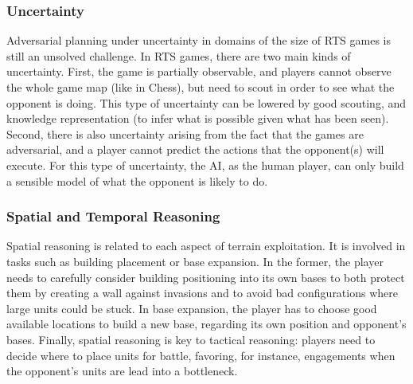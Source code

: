 \documentclass{llncs}
\begin{document}
\subsubsection{Uncertainty}
Adversarial planning under  uncertainty in domains of the  size of RTS
games is  still an unsolved  challenge.  In  RTS games, there  are two
main kinds  of uncertainty. First,  the game is  partially observable,
and players  cannot observe the  whole game  map (like in  Chess), but
need to scout in order to see what the opponent is doing. This type of
uncertainty   can  be   lowered  by   good  scouting,   and  knowledge
representation  (to  infer  what  is  possible  given  what  has  been
seen). Second,  there is also  uncertainty arising from the  fact that
the games  are adversarial,  and a player  cannot predict  the actions
that the opponent(s)  will execute. For this type  of uncertainty, the
AI, as the human  player, can only build a sensible  model of what the
opponent is likely to do.

\subsubsection{Spatial and Temporal Reasoning}
Spatial reasoning is  related to each aspect  of terrain exploitation.
It  is  involved   in  tasks  such  as  building   placement  or  base
expansion.  In the  former,  the player  needs  to carefully  consider
building  positioning into  its  own  bases to  both  protect them  by
creating  a wall  against invasions  and to  avoid bad  configurations
where large units could be stuck. In base expansion, the player has to
choose good available locations to build a new base, regarding its own
position and  opponent's bases. Finally,  spatial reasoning is  key to
tactical reasoning:  players need to  decide where to place  units for
battle, favoring, for instance,  engagements when the opponent's units
are lead into a bottleneck.
\end{document}
